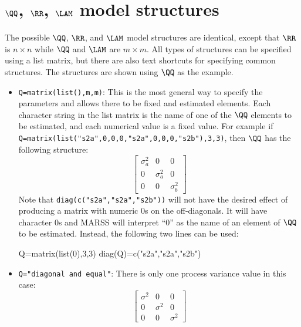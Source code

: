 \section{$\QQ$, $\RR$, $\LAM$ model structures}

The possible $\QQ$, $\RR$, and $\LAM$ model structures are identical, except that $\RR$ is $n \times n$ while $\QQ$ and $\LAM$ are $m \times m$.  All types of structures can be specified using a list matrix, but there are also text shortcuts for specifying common structures.  The structures are shown using $\QQ$ as the example.

\begin{itemize}\itemsep5pt
\item[] \texttt{Q=matrix(list(),m,m)}: This is the most general way to specify the parameters and allows there to be fixed and estimated elements.   Each character string in the list matrix is the name of one of the $\QQ$ elements to be estimated, and each numerical value is a fixed value.  For example if \newline   \texttt{Q=matrix(list("s2a",0,0,0,"s2a",0,0,0,"s2b"),3,3)}, \newline
then $\QQ$  has the following structure:
\begin{equation*}
 \left[ \begin{array}{ccc}
    \sigma^2_a & 0 & 0\\
    0 & \sigma^2_a & 0 \\
    0 & 0 & \sigma^2_b \end{array} \right]
\end{equation*}
Note that \texttt{diag(c("s2a","s2a","s2b"))} will not have the desired effect of producing a matrix with numeric 0s on the off-diagonals.  It will have character 0s and MARSS will interpret ``0'' as the name of an element of $\QQ$ to be estimated.  Instead, the following two lines can be used:
\begin{Schunk}
\begin{Sinput}
Q=matrix(list(0),3,3)
diag(Q)=c("s2a","s2a","s2b")
\end{Sinput}
\end{Schunk}

\item[] \texttt{Q="diagonal and equal"}: There is only one process variance value in this case:
\begin{equation*}
 \left[ \begin{array}{ccc}
    \sigma^2 & 0 & 0\\
    0 & \sigma^2 & 0 \\
    0 & 0 & \sigma^2 \end{array} \right]
\end{equation*}


\end{itemize}
